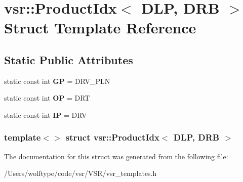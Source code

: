 \hypertarget{structvsr_1_1_product_idx_3_01_d_l_p_00_01_d_r_b_01_4}{\section{vsr\-:\-:Product\-Idx$<$ D\-L\-P, D\-R\-B $>$ Struct Template Reference}
\label{structvsr_1_1_product_idx_3_01_d_l_p_00_01_d_r_b_01_4}
}
\subsection*{Static Public Attributes}
\begin{DoxyCompactItemize}
\item 
\hypertarget{structvsr_1_1_product_idx_3_01_d_l_p_00_01_d_r_b_01_4_a1c1e37a059dbe429f35ed32601c8b410}{static const int {\bfseries G\-P} = D\-R\-V\-\_\-\-P\-L\-N}\label{structvsr_1_1_product_idx_3_01_d_l_p_00_01_d_r_b_01_4_a1c1e37a059dbe429f35ed32601c8b410}

\item 
\hypertarget{structvsr_1_1_product_idx_3_01_d_l_p_00_01_d_r_b_01_4_a80c7687187c4c5309381fc60a86e363b}{static const int {\bfseries O\-P} = D\-R\-T}\label{structvsr_1_1_product_idx_3_01_d_l_p_00_01_d_r_b_01_4_a80c7687187c4c5309381fc60a86e363b}

\item 
\hypertarget{structvsr_1_1_product_idx_3_01_d_l_p_00_01_d_r_b_01_4_a6459dd268764b2dd4fb0f2c5ce7d09f7}{static const int {\bfseries I\-P} = D\-R\-V}\label{structvsr_1_1_product_idx_3_01_d_l_p_00_01_d_r_b_01_4_a6459dd268764b2dd4fb0f2c5ce7d09f7}

\end{DoxyCompactItemize}
\subsubsection*{template$<$$>$ struct vsr\-::\-Product\-Idx$<$ D\-L\-P, D\-R\-B $>$}



The documentation for this struct was generated from the following file\-:\begin{DoxyCompactItemize}
\item 
/\-Users/wolftype/code/vsr/\-V\-S\-R/vsr\-\_\-templates.\-h\end{DoxyCompactItemize}
